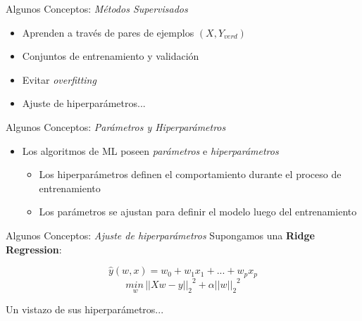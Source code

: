\documentclass[10pt]{beamer}
\begin{document}
\begin{frame}{Algunos Conceptos: \textit{Métodos Supervisados}}
\begin{itemize}[<+->]
  \item Aprenden a través de pares de ejemplos $(X, Y_{verd})$
  \item Conjuntos de entrenamiento y validación
  \item Evitar \textit{overfitting}
  \item Ajuste de hiperparámetros...
\end{itemize}
\end{frame}

\begin{frame}{Algunos Conceptos: \textit{Parámetros y Hiperparámetros}}
  \begin{itemize}
    \item Los algoritmos de ML poseen \textit{parámetros} e \textit{hiperparámetros}
    \begin{itemize}[<+->]
      \item Los hiperparámetros definen el comportamiento durante el proceso de entrenamiento
      \item Los parámetros se ajustan para definir el modelo luego del entrenamiento
    \end{itemize}

  \end{itemize}
\end{frame}


\begin{frame}{Algunos Conceptos: \textit{Ajuste de hiperparámetros}}
  Supongamos una \textbf{Ridge Regression}:
  \begin{center}
    $$\hat{y}(w, x) = w_0 + w_1 x_1 + ... + w_p x_p$$
    $$\underset{w}{min\,}{{||X w - y||_2}}^2 + \alpha{||w||_2}^2$$
  \end{center}
  \pause
  Un vistazo de sus hiperparámetros...
  \ridge
\end{frame}



\end{document}
